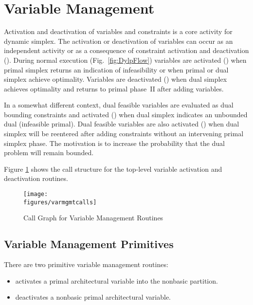\section{Variable Management}
\label{sec:VariableManagement}

Activation and deactivation of variables and constraints is a core activity
for dynamic simplex.
The activation or deactivation of variables can occur as an independent
activity or as a consequence of constraint activation and deactivation
(\vid {}).
During normal execution (\vid Fig.~\ref{fig:DylpFlow}) variables are
activated () when primal simplex returns an
indication of infeasibility or when
primal or dual simplex achieve optimality.
Variables are deactivated () when dual simplex
achieves optimality and returns to primal phase~II after adding variables.

In a somewhat different context, dual feasible variables are evaluated as
dual bounding constraints and activated () when dual
simplex indicates an unbounded dual (infeasible primal).
Dual feasible variables are also activated () when
dual simplex will be reentered
after adding constraints without an intervening primal simplex phase.
The motivation is to increase the probability that the dual problem
will remain bounded.

Figure \ref{fig:VarmgmtCalls} shows the call structure for the top-level
variable activation and deactivation routines.
\begin{figure}[htbp]
\centering
\texttt{[image: \\figures/varmgmtcalls]}
\caption{Call Graph for Variable Management Routines}\label{fig:VarmgmtCalls}
\end{figure}

\subsection{Variable Management Primitives}

There are two primitive variable management routines:
\begin{itemize}
  \item
   activates a primal architectural variable into the
  nonbasic partition.

  \item
   deactivates a nonbasic primal architectural
  variable.
\end{itemize}

